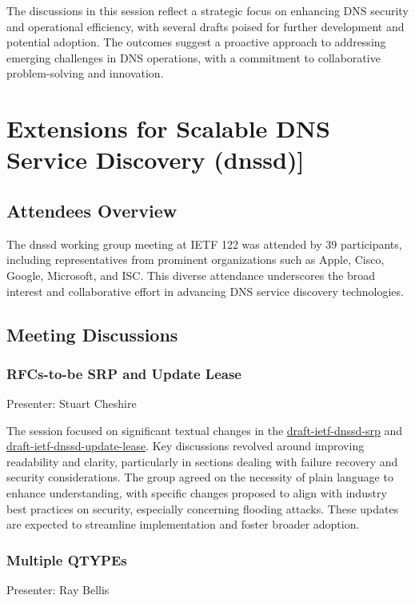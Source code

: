 \documentclass{article}
\begin{document}
The discussions in this session reflect a strategic focus on enhancing DNS security and operational efficiency, with several drafts poised for further development and potential adoption. The outcomes suggest a proactive approach to addressing emerging challenges in DNS operations, with a commitment to collaborative problem-solving and innovation.



\newpage

\section{Extensions for Scalable DNS Service Discovery (dnssd)]}

\subsection{Attendees Overview}
The dnssd working group meeting at IETF 122 was attended by 39 participants, including representatives from prominent organizations such as Apple, Cisco, Google, Microsoft, and ISC. This diverse attendance underscores the broad interest and collaborative effort in advancing DNS service discovery technologies.

\subsection{Meeting Discussions}

\subsubsection{RFCs-to-be SRP and Update Lease}
Presenter: Stuart Cheshire

The session focused on significant textual changes in the \href{https://datatracker.ietf.org/doc/html/draft-ietf-dnssd-srp}{draft-ietf-dnssd-srp} and \href{https://datatracker.ietf.org/doc/html/draft-ietf-dnssd-update-lease}{draft-ietf-dnssd-update-lease}. Key discussions revolved around improving readability and clarity, particularly in sections dealing with failure recovery and security considerations. The group agreed on the necessity of plain language to enhance understanding, with specific changes proposed to align with industry best practices on security, especially concerning flooding attacks. These updates are expected to streamline implementation and foster broader adoption.

\subsubsection{Multiple QTYPEs}
Presenter: Ray Bellis
\end{document}
